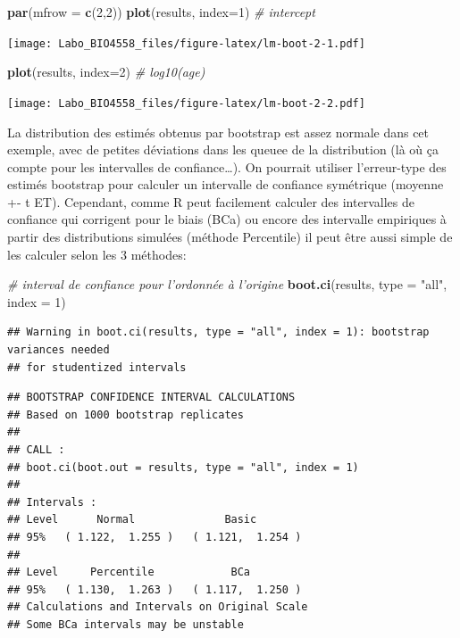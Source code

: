 \documentclass[12pt,]{book}
\newenvironment{Shaded}{\begin{snugshade}}{\end{snugshade}}
\newcommand{\CommentTok}[1]{\textcolor[rgb]{0.37,0.37,0.37}{\textit{#1}}}
\newcommand{\DataTypeTok}[1]{\textcolor[rgb]{0.27,0.27,0.27}{#1}}
\newcommand{\DecValTok}[1]{\textcolor[rgb]{0.06,0.06,0.06}{#1}}
\newcommand{\KeywordTok}[1]{\textcolor[rgb]{0.27,0.27,0.27}{\textbf{#1}}}
\newcommand{\NormalTok}[1]{#1}
\newcommand{\StringTok}[1]{\textcolor[rgb]{0.5,0.5,0.5}{#1}}
\begin{document}
\begin{Shaded}
\begin{Highlighting}[]
\KeywordTok{par}\NormalTok{(}\DataTypeTok{mfrow =} \KeywordTok{c}\NormalTok{(}\DecValTok{2}\NormalTok{,}\DecValTok{2}\NormalTok{))}
\KeywordTok{plot}\NormalTok{(results, }\DataTypeTok{index=}\DecValTok{1}\NormalTok{) }\CommentTok{# intercept}
\end{Highlighting}
\end{Shaded}

\texttt{[image: Labo\_BIO4558\_files/figure-latex/lm-boot-2-1.pdf]}

\begin{Shaded}
\begin{Highlighting}[]
\KeywordTok{plot}\NormalTok{(results, }\DataTypeTok{index=}\DecValTok{2}\NormalTok{) }\CommentTok{# log10(age)}
\end{Highlighting}
\end{Shaded}

\texttt{[image: Labo\_BIO4558\_files/figure-latex/lm-boot-2-2.pdf]}

La distribution des estimés obtenus par bootstrap est assez normale dans cet exemple, avec de petites déviations dans les queuee de la distribution (là où ça compte pour les intervalles de confiance\ldots{}). On pourrait utiliser l'erreur-type des estimés bootstrap pour calculer un intervalle de confiance symétrique (moyenne +- t ET). Cependant, comme R peut facilement calculer des intervalles de confiance qui corrigent pour le biais (BCa) ou encore des intervalle empiriques à partir des distributions simulées (méthode Percentile) il peut être aussi simple de les calculer selon les 3 méthodes:

\begin{Shaded}
\begin{Highlighting}[]
\CommentTok{# interval de confiance pour l'ordonnée à l'origine}
\KeywordTok{boot.ci}\NormalTok{(results, }\DataTypeTok{type =} \StringTok{"all"}\NormalTok{, }\DataTypeTok{index =} \DecValTok{1}\NormalTok{)}
\end{Highlighting}
\end{Shaded}

\begin{verbatim}
## Warning in boot.ci(results, type = "all", index = 1): bootstrap variances needed
## for studentized intervals
\end{verbatim}

\begin{verbatim}
## BOOTSTRAP CONFIDENCE INTERVAL CALCULATIONS
## Based on 1000 bootstrap replicates
## 
## CALL : 
## boot.ci(boot.out = results, type = "all", index = 1)
## 
## Intervals : 
## Level      Normal              Basic         
## 95%   ( 1.122,  1.255 )   ( 1.121,  1.254 )  
## 
## Level     Percentile            BCa          
## 95%   ( 1.130,  1.263 )   ( 1.117,  1.250 )  
## Calculations and Intervals on Original Scale
## Some BCa intervals may be unstable
\end{verbatim}
\end{document}
